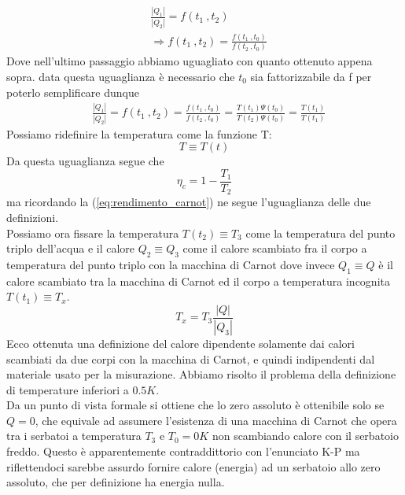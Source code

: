 \documentclass[10pt,a4paper]{article}
\begin{document}
\begin{align*}
&\frac{|Q_1|}{|Q_2|} = f(t_1\ ,t_2)\\
&\Rightarrow f(t_1\ , t_2) = \frac{f(t_1\ ,t_0)}{f(t_2\ ,t_0)}
\end{align*}
Dove nell'ultimo passaggio abbiamo uguagliato con quanto ottenuto appena sopra. data questa uguaglianza è necessario che \(t_0\) sia fattorizzabile da f per poterlo semplificare dunque
\begin{align}\label{eq:def_temperatura}
&\frac{|Q_1|}{|Q_2|} = f(t_1\ , t_2) = \frac{f(t_1\ ,t_0)}{f(t_2\ ,t_0)}= \frac{T(t_1)\Psi(t_0)}{T(t_2)\Psi(t_0)}=\frac{T(t_1)}{T(t_1)}
\end{align}
Possiamo ridefinire la temperatura come la funzione T: \[T \equiv T(t)\]
Da questa uguaglianza segue che 
\[\eta_c = 1-\frac{T_1}{T_2}\]
ma ricordando la (\ref{eq:rendimento_carnot}) ne segue l'uguaglianza delle due definizioni.\\
Possiamo ora fissare la temperatura $T(t_2)\equiv T_3$ come la temperatura del punto triplo dell'acqua e il calore \(Q_2\equiv Q_3\) come il calore scambiato fra il corpo a temperatura del punto triplo con la macchina di Carnot dove invece \(Q_1\equiv Q\) è il calore scambiato tra la macchina di Carnot ed il corpo a temperatura incognita \(T(t_1)\equiv T_x\). 
\[T_x = T_3\frac{|Q|}{|Q_3|}\]
Ecco ottenuta una definizione del calore dipendente solamente dai calori scambiati da due corpi con la macchina di Carnot, e quindi indipendenti dal materiale usato per la misurazione. Abbiamo risolto il problema della definizione di temperature inferiori a \(0.5 K\).\\
Da un punto di vista formale si ottiene che lo zero assoluto è ottenibile solo se \(Q = 0\), che equivale ad assumere l'esistenza di una macchina di Carnot che opera tra i serbatoi a temperatura \(T_3\) e \(T_0 = 0K\) non scambiando calore con il serbatoio freddo. Questo è apparentemente contraddittorio con l'enunciato K-P ma riflettendoci sarebbe assurdo fornire calore (energia) ad un serbatoio allo zero assoluto, che per definizione ha energia nulla. 
\end{document}
